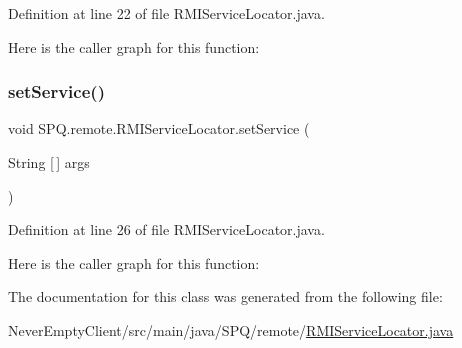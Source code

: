 Definition at line 22 of file R\+M\+I\+Service\+Locator.\+java.

Here is the caller graph for this function\+:
\mbox{\label{class_s_p_q_1_1remote_1_1_r_m_i_service_locator_ae4d529073f4b435fa3d0fedcaad0fc70}} 
\subsubsection{\texorpdfstring{set\+Service()}{setService()}}
{\footnotesize\ttfamily void S\+P\+Q.\+remote.\+R\+M\+I\+Service\+Locator.\+set\+Service (\begin{DoxyParamCaption}\item[{String \mbox{[}$\,$\mbox{]}}]{args }\end{DoxyParamCaption})}



Definition at line 26 of file R\+M\+I\+Service\+Locator.\+java.

Here is the caller graph for this function\+:


The documentation for this class was generated from the following file\+:\begin{DoxyCompactItemize}
\item 
Never\+Empty\+Client/src/main/java/\+S\+P\+Q/remote/\mbox{\hyperlink{_r_m_i_service_locator_8java}{R\+M\+I\+Service\+Locator.\+java}}\end{DoxyCompactItemize}
